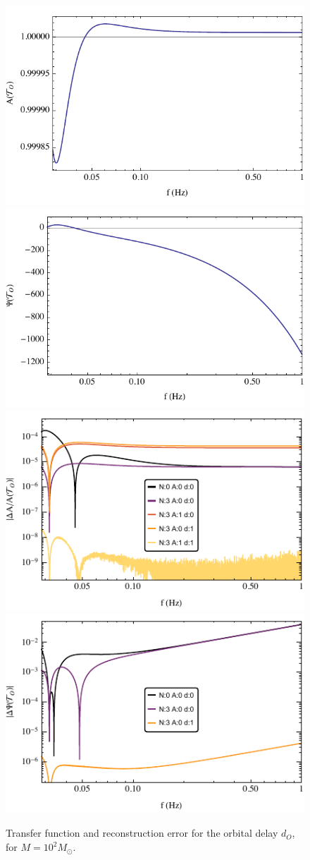 \documentclass[aps,showpacs,twocolumn,
prd,superscriptaddress,nofootinbib]{revtex4-1}
\newcommand{\Msol}{M_{\odot}}
\begin{document}
\begin{figure}
  \centering
  \includegraphics[width=.48\linewidth]{plots/LISAtransferM1e2dOamp.pdf}
  \hspace{0.2cm}
  \includegraphics[width=.48\linewidth]{plots/LISAtransferM1e2dOphase.pdf}
  \includegraphics[width=.48\linewidth]{plots/LISAerrorM1e2dOamp.pdf}
  \hspace{0.2cm}
  \includegraphics[width=.48\linewidth]{plots/LISAerrorM1e2dOphase.pdf}
  \caption{Transfer function and reconstruction error for the orbital delay $d_{O}$, for $M=10^{2} \Msol$.}
\end{figure}
\end{document}
